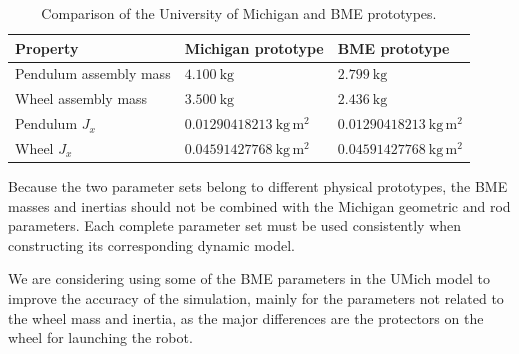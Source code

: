 \begin{table}[htbp]
  \centering
  \small
  \renewcommand{\arraystretch}{1.3}
  \caption{Comparison of the University of Michigan and BME prototypes.}
  \label{tab:prototype-mass-comparison}
  \begin{tabular}{
    p{}
    p{}
    p{}
  }
    \hline
    \textbf{Property}
    &
    \textbf{Michigan prototype}
    &
    \textbf{BME prototype}
    \\
    \hline

    Pendulum assembly mass
    &
    $4.100~\mathrm{kg}$
    &
    $2.799~\mathrm{kg}$
    \\

    Wheel assembly mass
    &
    $3.500~\mathrm{kg}$
    &
    $2.436~\mathrm{kg}$
    \\

    Pendulum $J_x$
    &
    $0.01290418213~\mathrm{kg\,m^2}$
    &
    $0.01290418213~\mathrm{kg\,m^2}$
    \\

    Wheel $J_x$
    &
    $0.04591427768~\mathrm{kg\,m^2}$
    &
    $0.04591427768~\mathrm{kg\,m^2}$
    \\

    \hline
  \end{tabular}
\end{table}

Because the two parameter sets belong to different physical prototypes, the BME masses and inertias should not be combined with the Michigan geometric and rod parameters. Each complete parameter set must be used consistently when constructing its corresponding dynamic model.

We are considering using some of the BME parameters in the UMich model to improve the accuracy of the simulation, mainly for the parameters not related to the wheel mass and inertia, as the major differences are the protectors on the wheel for launching the robot.